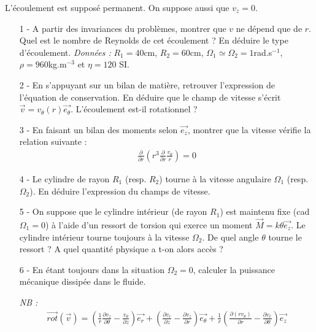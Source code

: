 \documentclass{report}
\begin{document}
L'écoulement est supposé permanent. On suppose aussi que $v_z=0$.

\begin{itemize}
	\item[1 - ] A partir des invariances du problèmes, montrer que $v$ ne dépend que de $r$. Quel est le nombre de Reynolds de cet écoulement ? En déduire le type d'écoulement. \textit{Données :} $R_1=40$cm, $R_2=60$cm, $\Omega_1\simeq\Omega_2=1$rad.s$^{-1}$, $\rho=960$kg.m$^{-3}$ et $\eta=120$ SI.

	\item[2 - ] En s'appuyant sur un bilan de matière, retrouver l'expression de l'équation de conservation. En déduire que le champ de vitesse s'écrit $\vec{v}=v_\theta (r)\vec{e_\theta}$. L'écoulement est-il rotationnel ?
	
	\item[3 - ] En faisant un bilan des moments selon $\vec{e_z}$, montrer que la vitesse vérifie la relation suivante : 
	\begin{align*}
		\frac{\partial}{\partial r}\left(r^3 \frac{\partial}{\partial r}\frac{v_\theta}{r} \right) =0
	\end{align*}
	
	\item[4 - ] Le cylindre de rayon $R_1$ (resp. $R_2$) tourne à la vitesse angulaire $\Omega_1$ (resp. $\Omega_2$). En déduire l'expression du champs de vitesse. 
	
	\item[5 - ] On suppose que le cylindre intérieur (de rayon $R_1$) est maintenu fixe (cad $\Omega_1=0$) à l'aide d'un ressort de torsion qui exerce un moment $\vec{M}=k\theta\vec{e_z}$. Le cylindre intérieur tourne toujours à la vitesse $\Omega_2$. De quel angle $\theta$ tourne le ressort ? A quel quantité physique a t-on alors accès ?
	
	\item[6 - ] En étant toujours dans la situation $\Omega_2=0$, calculer la puissance mécanique dissipée dans le fluide.
	
\textit{NB :} 
\begin{align*}
	\vec{rot}(\vec{v})=\left( \frac{1}{r}\frac{\partial v_z}{\partial\theta}-\frac{v_\theta}{\partial z}\right)\vec{e_r} + \left( \frac{\partial v_r}{\partial z}-\frac{\partial v_z}{\partial r}\right)\vec{e_\theta} + \frac{1}{r}\left( \frac{\partial (rv_\theta)}{\partial r}-\frac{\partial v_r}{\partial \theta}\right)\vec{e_z} 
\end{align*}	
	
\end{itemize}
\end{document}
